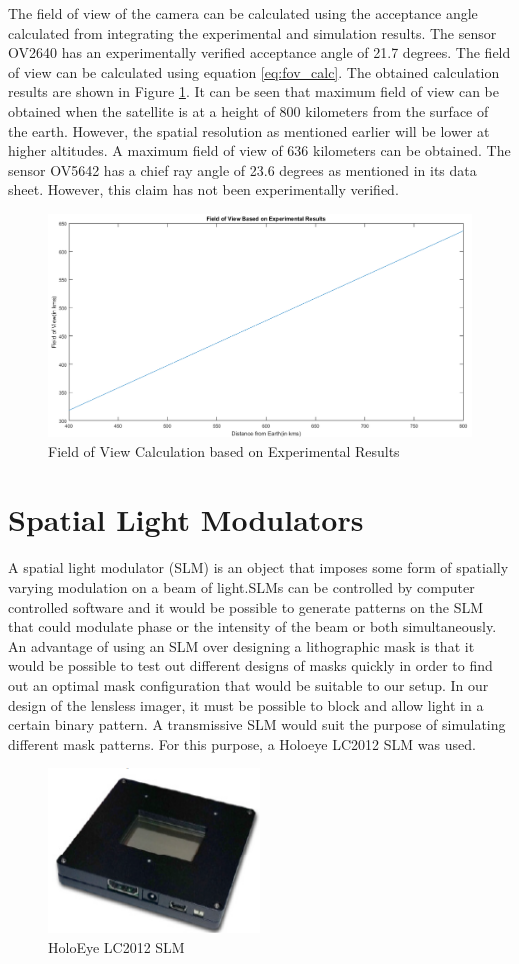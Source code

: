 The field of view of the camera can be calculated using the acceptance angle calculated from integrating the experimental and simulation results. The sensor OV2640 has an experimentally verified acceptance angle of 21.7 degrees. The field of view can be calculated using equation \ref{eq:fov_calc}. The obtained calculation results are shown in Figure \ref{fig:fov-graph-1}. It can be seen that maximum field of view can be obtained when the satellite is at a height of 800 kilometers from the surface of the earth. However, the spatial resolution as mentioned earlier will be lower at higher altitudes. A maximum field of view of 636 kilometers can be obtained. The sensor OV5642 has a chief ray angle of 23.6 degrees as mentioned in its data sheet\cite{OV5642DS}. However, this claim has not been experimentally verified.

\begin{figure}[]
\centering
\includegraphics[width = \linewidth]{pics/fov-calc}
\caption{Field of View Calculation based on Experimental Results}
\label{fig:fov-graph-1}
\end{figure}

\section{Spatial Light Modulators}
A spatial light modulator (SLM) is an object that imposes some form of spatially varying modulation on a beam of light\cite{SLMWiki}.SLMs can be controlled by computer controlled software and it would be possible to generate patterns on the SLM that could modulate phase or the intensity of the beam or both simultaneously. An advantage of using an SLM over designing a lithographic mask is that it would be possible to test out different designs of masks quickly in order to find out an optimal mask configuration that would be suitable to our setup. In our design of the lensless imager, it must be possible to block and allow light in a certain binary pattern. A transmissive SLM would suit the purpose of simulating different mask patterns. For this purpose, a Holoeye LC2012 SLM was used.

\begin{figure}[ht]
\centering
\includegraphics[width=0.5\textwidth]{pics/slm}
\caption{HoloEye LC2012 SLM}
\label{fig:slm}
\end{figure}
